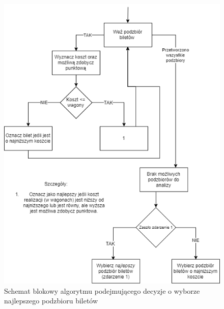 \documentclass[12pt, oneside]{report}
\begin{document}
\begin{figure}[h]
	\centering
	\includegraphics[height=0.6\textheight]{Bilety.png}
	\caption{Schemat blokowy algorytmu podejmującego decyzje o wyborze najlepszego podzbioru biletów}
	\label{figure:bilety_diagram}
\end{figure}
\end{document}
